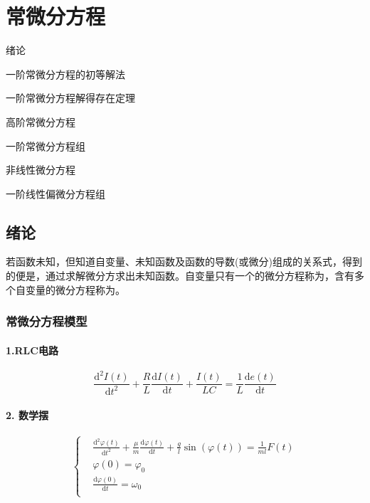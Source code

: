 \chapter{常微分方程}

\begin{introduction}       
	\item 绪论
	\item 一阶常微分方程的初等解法
	\item 一阶常微分方程解得存在定理
	\item 高阶常微分方程 
	\item 一阶常微分方程组
	\item 非线性微分方程
	\item 一阶线性偏微分方程组		
\end{introduction}

\section{绪论}

若函数未知，但知道自变量、未知函数及函数的导数(或微分)组成的关系式，得到的便是，通过求解微分方求出未知函数。自变量只有一个的微分方程称为，含有多个自变量的微分方程称为。

\subsection{常微分方程模型}

\subsubsection{1.RLC电路}
$$
\frac{\mathrm{d^2}I(t)}{\mathrm{d}t^2}+\frac{R}{L}\frac{\mathrm{d}I(t)}{\mathrm{d}t}+\frac{I(t)}{LC} = \frac{1}{L}\frac{\mathrm{d}e(t)}{\mathrm{d}t}
$$

\subsubsection{2. 数学摆}
$$
\left\{ 
\begin{aligned}
{}&\frac{\mathrm{d^2}\varphi(t)}{\mathrm{d}t^2}+\frac{\mu}{m}\frac{\mathrm{d}\varphi(t)}{\mathrm{d}t}+\frac{g}{l}\sin(\varphi(t)) = \frac{1}{ml}F(t)\\
{}&\varphi(0) =\varphi_0\\
{}&\frac{\mathrm{d}\varphi(0)}{\mathrm{d}t}=\omega_0\\
\end{aligned}
\right. 
$$

